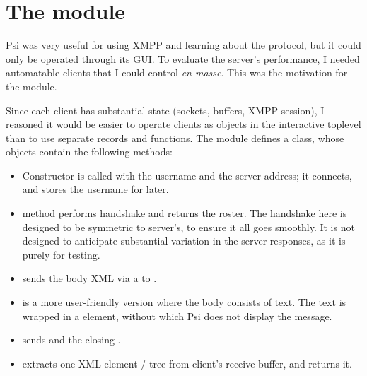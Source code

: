 \section{The  module}\label{sec:mod-client}
Psi was very useful for using XMPP and learning about the protocol, but it could only be operated through its GUI. To evaluate the server's performance, I needed automatable clients that I could control \emph{en masse}. This was the motivation for the  module.

Since each client has substantial state (sockets, buffers, XMPP session), I reasoned it would be easier to operate clients as objects in the interactive toplevel than to use separate records and functions. The module defines a  class, whose objects contain the following methods:

\begin{itemize}
  \item Constructor  is called with the username and the server address; it connects, and stores the username for later.

  \item {} method performs handshake and returns the roster. The handshake here is designed to be symmetric to server's, to ensure it all goes smoothly. It is not designed to anticipate substantial variation in the server responses, as it is purely for testing.

  \item {} sends the body XML via a  to .

  \item {} is a more user-friendly version where the body consists of text. The text is wrapped in a  element, without which Psi does not display the message.

  \item {} sends  and the closing .

  \item {} extracts one XML element / tree from client's receive buffer, and returns it.
\end{itemize}

